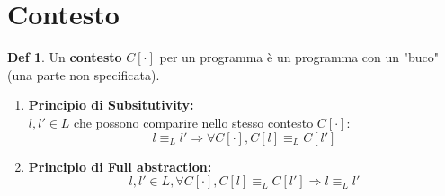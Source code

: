 \documentclass[a4paper]{report}
\theoremstyle{definition} \newtheorem*{defi}{Def}
\theoremstyle{plain} \newtheorem{lemma}{Lemma}
\theoremstyle{plain} \newtheorem{teo}{Teorema}
\theoremstyle{remark} \newtheorem*{es}{Esempio}
\begin{document}
\section{Contesto}
\begin{defi}
	Un {\bf contesto} $C[\cdot]$ per un programma è un programma con un "buco" (una parte non specificata).
	\end{defi}
	\begin{enumerate}
	\item {\bf Principio di Subsitutivity:}
	\\
	$l, l' \in L$ che possono comparire nello stesso contesto $C[\cdot]$:
	$$
		l \equiv_L l' \Rightarrow \forall C[\cdot] , C[l] \equiv_L C[l']
	$$
	\item {\bf Principio di Full abstraction:}
	$$
		l,l' \in L, \forall C[\cdot], C[l] \equiv_L C[l'] \Longrightarrow l \equiv_L l'
	$$
\end{enumerate}
\end{document}
